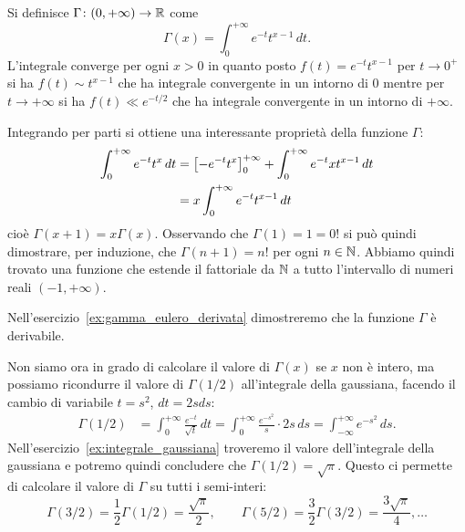 \begin{example}%
  \label{ex:gamma_eulero}%
  Si definisce $\Gamma\colon (0,+\infty) \to \mathbb R$ come
  \[
    \Gamma(x) = \int_0^{+\infty} e^{-t} t^{x-1}\, dt.
  \]
  L'integrale converge per ogni $x>0$ in quanto posto
  $f(t) = e^{-t} t^{x-1}$ per $t\to 0^+$ si ha $f(t) \sim t^{x-1}$ che ha
  integrale convergente in un intorno di $0$ mentre per $t\to +\infty$ si ha
  $f(t) \ll e^{-t/2}$ che ha integrale convergente in un intorno di $+\infty$.
  
  Integrando per parti si ottiene una interessante proprietà della funzione $\Gamma$:
  \begin{align*}
  \int_0^{+\infty} e^{-t}t^{x}\, dt
  &= {\left[ -e^{-t}t^{x} \right]}_0^{+\infty}
  + \int_0^{+\infty} e^{-t}xt^{x-1}\, dt\\
  &= x\int_0^{+\infty} e^{-t}t^{x-1}\, dt
  \end{align*}
  cioè $\Gamma(x+1) = x\Gamma(x)$.
  Osservando che $\Gamma(1)=1=0!$ si può quindi dimostrare, per induzione,
  che $\Gamma(n+1) = n!$ per ogni $n\in \mathbb N$.
  Abbiamo quindi trovato una funzione che estende il fattoriale
  da $\mathbb N$ a tutto l'intervallo di numeri reali $(-1,+\infty)$.
  
  Nell'esercizio~\ref{ex:gamma_eulero_derivata} dimostreremo 
  che la funzione $\Gamma$ è derivabile.
  
  Non siamo ora in grado di calcolare il valore di $\Gamma(x)$ se $x$ 
  non è intero, ma possiamo ricondurre il valore di $\Gamma(1/2)$ 
  all'integrale della gaussiana, facendo il cambio 
  di variabile $t=s^2$, $dt=2s ds$:
  \begin{align*}
  \Gamma(1/2) 
  &= \int_0^{+\infty} \frac{e^{-t}}{\sqrt t}\, dt  
  = \int_0^{+\infty} \frac{e^{-s^2}}{s} \cdot 2s\, ds
  = \int_{-\infty}^{+\infty} e^{-s^2}\, ds.
  \end{align*}
  Nell'esercizio~\ref{ex:integrale_gaussiana} troveremo il valore 
  dell'integrale della gaussiana e potremo 
  quindi concludere che $\Gamma(1/2) = \sqrt \pi$.
  Questo ci permette di calcolare il valore di $\Gamma$ su 
  tutti i semi-interi:
  \[
  \Gamma(3/2) = \frac 1 2 \Gamma(1/2) = \frac{\sqrt \pi}{2}, \qquad
  \Gamma(5/2) = \frac 3 2 \Gamma(3/2) = \frac{3\sqrt \pi}{4}, \dots 
  \]
\end{example}
    
